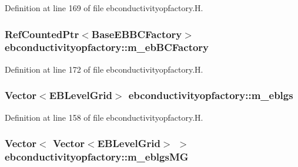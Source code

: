 Definition at line 169 of file ebconductivityopfactory.\+H.

\subsubsection[{\texorpdfstring{m\+\_\+eb\+B\+C\+Factory}{m_ebBCFactory}}]{\setlength{\rightskip}{0pt plus 5cm}Ref\+Counted\+Ptr$<$Base\+E\+B\+B\+C\+Factory$>$ ebconductivityopfactory\+::m\+\_\+eb\+B\+C\+Factory\hspace{0.3cm}{\ttfamily [protected]}}\hypertarget{classebconductivityopfactory_aba737252beaa8db65a305ecf7b11ec75}{}\label{classebconductivityopfactory_aba737252beaa8db65a305ecf7b11ec75}


Definition at line 172 of file ebconductivityopfactory.\+H.

\subsubsection[{\texorpdfstring{m\+\_\+eblgs}{m_eblgs}}]{\setlength{\rightskip}{0pt plus 5cm}Vector$<$E\+B\+Level\+Grid$>$ ebconductivityopfactory\+::m\+\_\+eblgs\hspace{0.3cm}{\ttfamily [protected]}}\hypertarget{classebconductivityopfactory_a665c08edd2bb8ff2c9bde58b2801b239}{}\label{classebconductivityopfactory_a665c08edd2bb8ff2c9bde58b2801b239}


Definition at line 158 of file ebconductivityopfactory.\+H.

\subsubsection[{\texorpdfstring{m\+\_\+eblgs\+MG}{m_eblgsMG}}]{\setlength{\rightskip}{0pt plus 5cm}Vector$<$ Vector$<$E\+B\+Level\+Grid$>$ $>$ ebconductivityopfactory\+::m\+\_\+eblgs\+MG\hspace{0.3cm}{\ttfamily [protected]}}\hypertarget{classebconductivityopfactory_afbf167416b0176ba62a44cd422bd6091}{}\label{classebconductivityopfactory_afbf167416b0176ba62a44cd422bd6091}


